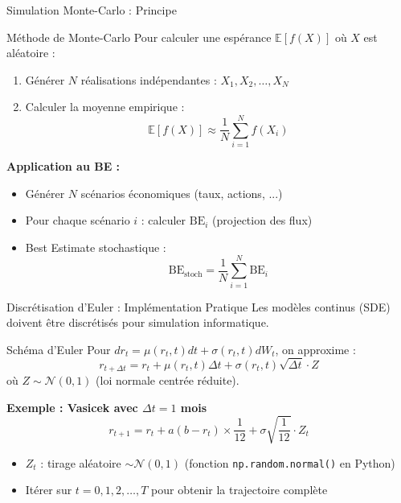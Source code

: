\documentclass[10pt,aspectratio=169]{beamer}
\newcommand{\BE}{\text{BE}}
\newcommand{\E}{\mathbb{E}}
\begin{document}
\begin{frame}{Simulation Monte-Carlo : Principe}
\begin{block}{Méthode de Monte-Carlo}
Pour calculer une espérance $\E[f(X)]$ où $X$ est aléatoire :
\begin{enumerate}
    \item Générer $N$ réalisations indépendantes : $X_1, X_2, \ldots, X_N$
    \item Calculer la moyenne empirique :
    \[
    \E[f(X)] \approx \frac{1}{N}\sum_{i=1}^{N} f(X_i)
    \]
\end{enumerate}
\end{block}

\vspace{0.3cm}
\textbf{Application au BE :}
\begin{itemize}
    \item Générer $N$ scénarios économiques (taux, actions, ...)
    \item Pour chaque scénario $i$ : calculer $\BE_i$ (projection des flux)
    \item Best Estimate stochastique :
    \[
    \BE_{\text{stoch}} = \frac{1}{N}\sum_{i=1}^{N} \BE_i
    \]
\end{itemize}
\end{frame}

\begin{frame}{Discrétisation d'Euler : Implémentation Pratique}
Les modèles continus (SDE) doivent être discrétisés pour simulation informatique.
\begin{block}{Schéma d'Euler}
Pour $dr_t = \mu(r_t, t)dt + \sigma(r_t, t)dW_t$, on approxime :
\[
r_{t+\Delta t} = r_t + \mu(r_t, t)\Delta t + \sigma(r_t, t)\sqrt{\Delta t} \cdot Z
\]
où $Z \sim \mathcal{N}(0,1)$ (loi normale centrée réduite).
\end{block}

\vspace{0.3cm}
\textbf{Exemple : Vasicek avec $\Delta t = 1$ mois}
\[
r_{t+1} = r_t + a(b - r_t) \times \frac{1}{12} + \sigma \sqrt{\frac{1}{12}} \cdot Z_t
\]

\begin{itemize}
    \item $Z_t$ : tirage aléatoire $\sim \mathcal{N}(0,1)$ (fonction \texttt{np.random.normal()} en Python)
    \item Itérer sur $t = 0, 1, 2, \ldots, T$ pour obtenir la trajectoire complète
\end{itemize}
\end{frame}
\end{document}
